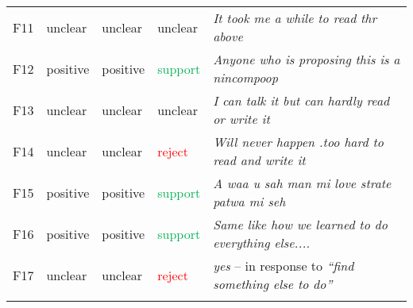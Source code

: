 \documentclass[output=paper,colorlinks,citecolor=brown]{langscibook}
\begin{document}
\begin{longtable}{llllp{6cm}}
 {F11} & {unclear} & {unclear} & {unclear} & {\textit{\textcolor[HTML]{1C1E21}{It took me a while to read thr above}}} \\
 {F12} & {positive} & {positive} & {\textcolor[HTML]{00B050}{support}} & {\textit{\textcolor[HTML]{1C1E21}{Anyone who is proposing this is a nincompoop}}} \\
 {F13} & {unclear} & {unclear} & {unclear} & {\textit{\textcolor[HTML]{1C1E21}{I can talk it but can hardly read or write it}}} \\
 {F14} & {unclear} & {unclear} & {\textcolor[HTML]{FF0000}{reject}} & {\textit{\textcolor[HTML]{1C1E21}{Will never happen .too hard to read and write it}}} \\
 {F15} & {positive} & {positive} & {\textcolor[HTML]{00B050}{support}} & {\textit{\textcolor[HTML]{1C1E21}{A waa u sah man mi love strate patwa mi seh}}} \\
 {F16} & {positive} & {positive} & {\textcolor[HTML]{00B050}{support}} & {\textit{\textcolor[HTML]{1C1E21}{Same like how we learned to do everything else....}}} \\
 {F17} & {unclear} & {unclear} & {\textcolor[HTML]{FF0000}{reject}} & {\textit{yes }-- in response to\textit{ ``find something else to do''}} \\
 \lspbottomrule
 \end{longtable}
\end{document}
